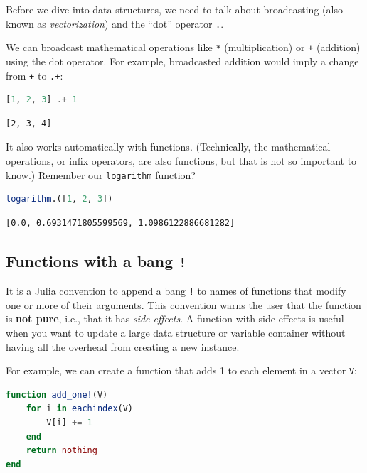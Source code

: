 \documentclass[
  notoc %
]{tufte-book}
\newcommand{\passthrough}[1]{#1}
\begin{document}
Before we dive into data structures, we need to talk about broadcasting
(also known as \emph{vectorization}) and the ``dot'' operator
\passthrough{\lstinline!.!}.

We can broadcast mathematical operations like
\passthrough{\lstinline!*!} (multiplication) or
\passthrough{\lstinline!+!} (addition) using the dot operator. For
example, broadcasted addition would imply a change from
\passthrough{\lstinline!+!} to \passthrough{\lstinline!.+!}:

\begin{lstlisting}[language=Julia]
[1, 2, 3] .+ 1
\end{lstlisting}

\begin{lstlisting}[language=Output]
[2, 3, 4]
\end{lstlisting}

It also works automatically with functions. (Technically, the
mathematical operations, or infix operators, are also functions, but
that is not so important to know.) Remember our
\passthrough{\lstinline!logarithm!} function?

\begin{lstlisting}[language=Julia]
logarithm.([1, 2, 3])
\end{lstlisting}

\begin{lstlisting}[language=Output]
[0.0, 0.6931471805599569, 1.0986122886681282]
\end{lstlisting}

\hypertarget{sec:function_bang}{%
\subsection{\texorpdfstring{Functions with a bang
\texttt{!}}{Functions with a bang !}}\label{sec:function_bang}}

It is a Julia convention to append a bang \passthrough{\lstinline"!"} to
names of functions that modify one or more of their arguments. This
convention warns the user that the function is \textbf{not pure}, i.e.,
that it has \emph{side effects}. A function with side effects is useful
when you want to update a large data structure or variable container
without having all the overhead from creating a new instance.

For example, we can create a function that adds 1 to each element in a
vector \passthrough{\lstinline!V!}:

\begin{lstlisting}[language=Julia]
function add_one!(V)
    for i in eachindex(V)
        V[i] += 1
    end
    return nothing
end
\end{lstlisting}
\end{document}
